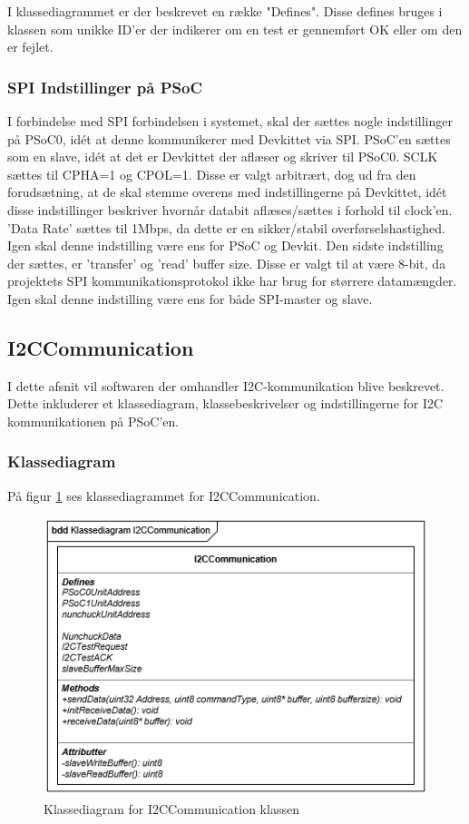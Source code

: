 I klassediagrammet er der beskrevet en række "Defines". Disse defines bruges i klassen som unikke ID'er der indikerer om en test er gennemført OK eller om den er fejlet.

\subsubsection{SPI Indstillinger på PSoC}
I forbindelse med SPI forbindelsen i systemet, skal der sættes nogle indstillinger på PSoC0, idét at denne kommunikerer med Devkittet via SPI. 
PSoC'en sættes som en slave, idét at det er Devkittet der aflæser og skriver til PSoC0.
SCLK sættes til CPHA=1 og CPOL=1. Disse er valgt arbitrært, dog ud fra den forudsætning, at de skal stemme overens med indstillingerne på Devkittet, idét disse indstillinger beskriver hvornår databit aflæses/sættes i forhold til clock'en. 
'Data Rate' sættes til 1Mbps, da dette er en sikker/stabil overførselshastighed. Igen skal denne indstilling være ens for PSoC og Devkit.
Den sidste indstilling der sættes, er 'transfer' og 'read' buffer size. Disse er valgt til at være 8-bit, da projektets SPI kommunikationsprotokol ikke har brug for størrere datamængder. Igen skal denne indstilling være ens for både SPI-master og slave. 

\subsection{I2CCommunication}
I dette afsnit vil softwaren der omhandler I2C-kommunikation blive beskrevet. Dette inkluderer et klassediagram,  klassebeskrivelser og indstillingerne for I2C kommunikationen på PSoC'en.

\subsubsection{Klassediagram}
På figur \ref{figure:klassediagramI2CCommunication} ses klassediagrammet for I2CCommunication. 
\begin{figure}[H]
	\centering
	\includegraphics[]{DesignOgImplementering/images/I2CCommunication}
	\caption{Klassediagram for I2CCommunication klassen}
	\label{figure:klassediagramI2CCommunication}
\end{figure}

